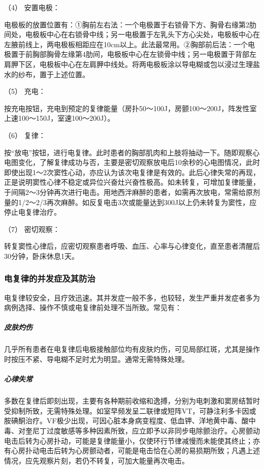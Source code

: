 \hypertarget{text00373.htmlux5cux23CHP16-4-4-3-4}{}
（4） 安置电极：

电极板的放置位置有：①胸前左右法：一个电极置于右锁骨下方、胸骨右缘第2肋间处，电极板中心在右锁骨中线；另一电极置于左乳头下方心尖处，电极板中心在左腋前线上，两电极板相距应在10cm以上。此法最常用。②胸部前后法：一个电极置于前胸部胸骨左缘第4肋间，电极板中心在左锁骨中线；另一电极置于背部左肩胛下区，电极板中心在左肩胛中线处。将两电极板涂以导电糊或包以浸过生理盐水的纱布，置于上述位置。

\hypertarget{text00373.htmlux5cux23CHP16-4-4-3-5}{}
（5） 充电：

按充电按钮，充电到预定的复律能量（房扑50～100J，房颤100～200J，阵发性室上速100～150J，室速100～200J）。

\hypertarget{text00373.htmlux5cux23CHP16-4-4-3-6}{}
（6） 复律：

按“放电”按钮，进行电复律。此时患者的胸部肌肉和上肢将抽动一下。随即观察心电图变化，了解复律成功与否，主要是密切观察放电后10余秒的心电图情况，此时即使出现1～2次窦性心动，亦应认为该次电复律是有效的。此后心律失常的再现，正是说明窦性心律不稳定或异位兴奋灶兴奋性极高。如未转复，可增加复律能量，于间隔2～3分钟再次进行电击。用地西泮麻醉的患者，如需再次放电，常需给原剂量的1/2～2/3再次麻醉。如反复电击3次或能量达到300J以上仍未转复为窦性，应停止电复律治疗。

\hypertarget{text00373.htmlux5cux23CHP16-4-4-3-7}{}
（7） 密切观察：

转复窦性心律后，应密切观察患者呼吸、血压、心率与心律变化，直至患者清醒后30分钟，卧床休息1天。

\subsubsection{电复律的并发症及其防治}

电复律较安全，且疗效迅速。其并发症一般不多，也较轻，发生严重并发症者多为病例选择、操作不慎或电复律前处理不当所致。常见有：

\subparagraph{皮肤灼伤}

几乎所有患者在电复律后电极接触部位均有皮肤灼伤，可见局部红斑，尤其是操作时按压不紧、导电糊不足时尤为明显。通常无需特殊处理。

\subparagraph{心律失常}

多数在复律后即刻出现，主要有各种期前收缩和逸搏，分别为电刺激和窦房结暂时受抑制所致，无需特殊处理。如室早频发呈二联律或短阵VT，可静注利多卡因或胺碘酮治疗。VF极少出现，可因心脏本身病变程度、低血钾、洋地黄中毒、酸中毒、对奎尼丁过度敏感等多种因素所致，应立即予以非同步电除颤治疗。心房颤动电击后转为心房扑动，可能是复律能量小，仅使环行节律减慢而未能使其终止；亦有心房扑动电击后转为心房颤动者，可能是电击恰在心房的易损期所致；凡遇上述情况，应先观察片刻，若仍不转复，可加大能量再次电击。


